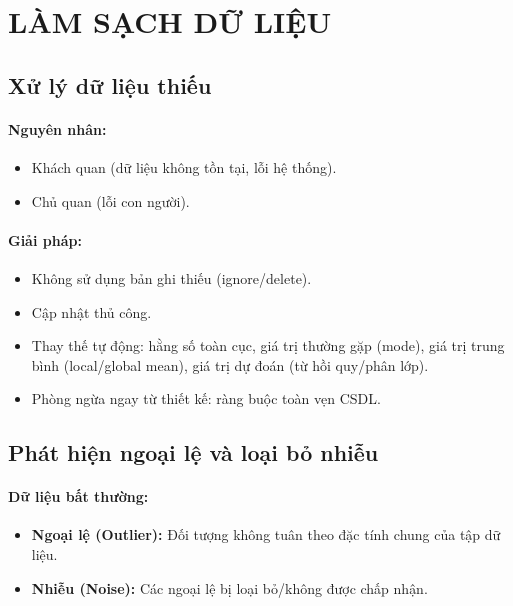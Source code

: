 \documentclass[10pt]{article}
\begin{document}
\section{LÀM SẠCH DỮ LIỆU}

\subsection{Xử lý dữ liệu thiếu}

\paragraph{Nguyên nhân:} 

\begin{itemize}
    \item Khách quan (dữ liệu không tồn tại, lỗi hệ thống).
    \item Chủ quan (lỗi con người).
\end{itemize}

\paragraph{Giải pháp:}
\begin{itemize}
    \item Không sử dụng bản ghi thiếu (ignore/delete).
    \item Cập nhật thủ công.
    \item Thay thế tự động: hằng số toàn cục, giá trị thường gặp (mode), giá trị trung bình (local/global mean), giá trị dự đoán (từ hồi quy/phân lớp).
    \item Phòng ngừa ngay từ thiết kế: ràng buộc toàn vẹn CSDL.
\end{itemize}

\subsection{Phát hiện ngoại lệ và loại bỏ nhiễu}

\paragraph{Dữ liệu bất thường:}
\begin{itemize}
\item \textbf{Ngoại lệ (Outlier):} Đối tượng không tuân theo đặc tính chung của tập dữ liệu.

\item \textbf{Nhiễu (Noise):} Các ngoại lệ bị loại bỏ/không được chấp nhận.
\end{itemize}
\end{document}

